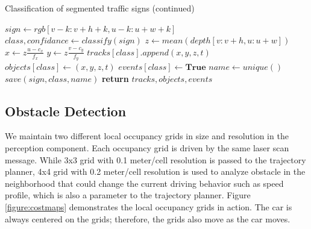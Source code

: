 \begin{algorithm}
\ContinuedFloat
\caption{Classification of segmented traffic signs (continued)}
  \begin{algorithmic}
      \State $sign \gets rgb[v-k:v+h+k, u-k:u+w+k]$
      \State $class, confidance \gets classify(sign)$
        \State $z \gets mean(depth[v:v+h, u:u+w])$
        \State $x \gets z\frac{u-c_x}{f_x}$
        \State $y \gets z\frac{v-c_y}{f_y}$
        \State $tracks[class].append(x, y, z, t)$
          \State $objects[class] \gets (x, y, z, t)$
          \State $events[class] \gets \textbf{True}$
            \State $name \gets unique()$
            \State $save(sign, class, name)$
          \EndIf
        \EndIf
      \EndIf
    \EndFor
    \State \textbf{return} $tracks, objects, events$
    \EndProcedure
  \end{algorithmic}
\end{algorithm}

\subsection{Obstacle Detection}

We maintain two different local occupancy grids in size and resolution in the
perception component. Each occupancy grid is driven by the same laser scan
message. While 3x3 grid with 0.1 meter/cell resolution is passed to the
trajectory planner, 4x4 grid with 0.2 meter/cell resolution is used to analyze
obstacle in the neighborhood that could change the current driving behavior
such as speed profile, which is also a parameter to the trajectory planner.
Figure \ref{figure:costmaps} demonstrates the local occupancy grids in action.
The car is always centered on the grids; therefore, the grids also move as the
car moves.

